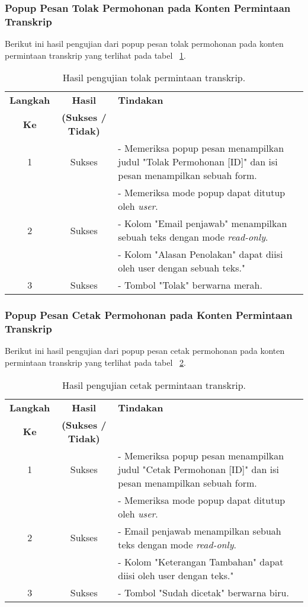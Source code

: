 \subsubsection{Popup Pesan Tolak Permohonan pada Konten Permintaan Transkrip}
Berikut ini hasil pengujian dari popup pesan tolak permohonan pada konten permintaan transkrip yang terlihat pada tabel ~\ref{hasil:TolakPermintaanTranskrip}.
\begin{table}[H]
	\centering 
	\caption{Hasil pengujian tolak permintaan transkrip.}
	\label{hasil:TolakPermintaanTranskrip}
	\begin{tabular}{|c| c| p{}|}
		\toprule
		\textbf{Langkah} & \textbf{Hasil} & \textbf{Tindakan}\\
		\textbf{Ke} & \textbf{(Sukses / Tidak)} &\\
		\midrule
		1&Sukses& - Memeriksa popup pesan menampilkan judul "Tolak Permohonan [ID]" dan isi pesan menampilkan sebuah form.\\
		&& - Memeriksa mode popup dapat ditutup oleh \textit{user}.\\
		\hline
		2&Sukses& - Kolom "Email penjawab" menampilkan sebuah teks dengan mode \textit{read-only}.\\
		&& - Kolom "Alasan Penolakan" dapat diisi oleh user dengan sebuah teks."\\
		\hline
		3&Sukses&- Tombol "Tolak" berwarna merah.\\		
		\bottomrule		
	\end{tabular} 
\end{table}

\subsubsection{Popup Pesan Cetak Permohonan pada Konten Permintaan Transkrip}
Berikut ini hasil pengujian dari popup pesan cetak permohonan pada konten permintaan transkrip yang terlihat pada tabel ~\ref{hasil:CetakPermintaanTranskrip}.
\begin{table}[H]
	\centering 
	\caption{Hasil pengujian cetak permintaan transkrip.}
	\label{hasil:CetakPermintaanTranskrip}
	\begin{tabular}{|c| c| p{}|}
		\toprule
		\textbf{Langkah} & \textbf{Hasil} & \textbf{Tindakan}\\
		\textbf{Ke} & \textbf{(Sukses / Tidak)} &\\
		\midrule
		1&Sukses& - Memeriksa popup pesan menampilkan judul "Cetak Permohonan [ID]" dan isi pesan menampilkan sebuah form.\\
		&& - Memeriksa mode popup dapat ditutup oleh \textit{user}.\\
		\hline
		2&Sukses& - Email penjawab menampilkan sebuah teks dengan mode \textit{read-only}.\\
		&& - Kolom "Keterangan Tambahan" dapat diisi oleh user dengan teks."\\
		\hline
		3&Sukses&- Tombol "Sudah dicetak" berwarna biru.\\		
		\bottomrule		
	\end{tabular} 
\end{table}

